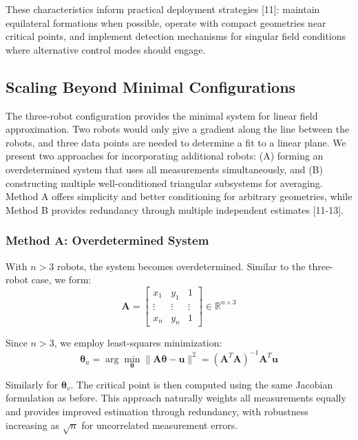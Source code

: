 \documentclass[lettersize,journal]{IEEEtran}
\begin{document}
These characteristics inform practical deployment strategies [11]: maintain equilateral formations when possible, operate with compact geometries near critical points, and implement detection mechanisms for singular field conditions where alternative control modes should engage.

\subsection{Scaling Beyond Minimal Configurations}

The three-robot configuration provides the minimal system for linear field approximation. Two robots would only give a gradient along the line between the robots, and three data points are needed to determine a fit to a linear plane. We present two approaches for incorporating additional robots: (A) forming an overdetermined system that uses all measurements simultaneously, and (B) constructing multiple well-conditioned triangular subsystems for averaging. Method A offers simplicity and better conditioning for arbitrary geometries, while Method B provides redundancy through multiple independent estimates [11-13].

\subsubsection{Method A: Overdetermined System}

With $n > 3$ robots, the system becomes overdetermined. Similar to the three-robot case, we form:
\begin{equation}
\mathbf{A} = \begin{bmatrix} x_1 & y_1 & 1 \\ \vdots & \vdots & \vdots \\ x_n & y_n & 1 \end{bmatrix} \in \mathbb{R}^{n \times 3}
\end{equation}

Since $n > 3$, we employ least-squares minimization:
\begin{equation}
\boldsymbol{\theta}_u = \arg\min_{\boldsymbol{\theta}} \|\mathbf{A}\boldsymbol{\theta} - \mathbf{u}\|^2 = (\mathbf{A}^T\mathbf{A})^{-1}\mathbf{A}^T\mathbf{u}
\end{equation}

Similarly for $\boldsymbol{\theta}_v$. The critical point is then computed using the same Jacobian formulation as before. This approach naturally weights all measurements equally and provides improved estimation through redundancy, with robustness increasing as $\sqrt{n}$ for uncorrelated measurement errors.
\end{document}
